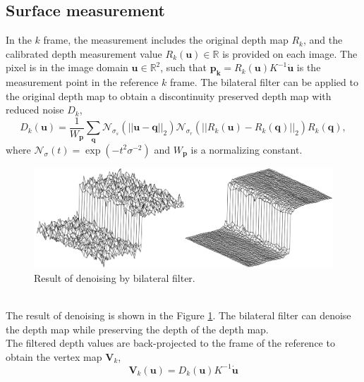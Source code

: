 \documentclass[a4paper,12pt]{article}
\begin{document}
\subsection{Surface measurement}
In the $k$ frame, the measurement includes the original depth map $R_k$, and the calibrated depth measurement value $R_k(\mathbf{u})\in\mathbb{R}$ is provided on each image. 
The pixel is in the image domain $\mathbf{u}\in\mathbb{R}^2$, such that $\mathbf{p_k} = R_k(\mathbf{u})K^{-1}\dot{\mathbf{u}}$ is the measurement point in the reference $k$ frame.
The bilateral filter can be applied to the original depth map to obtain a discontinuity preserved depth map with reduced noise $D_k$,
\begin{equation}
	D_{k}(\mathbf{u}) = \frac{1}{W_\mathbf{p}}\sum_{\mathbf{q}}\mathcal{N}_{\sigma_{s}}(||\mathbf{u}-\mathbf{q}||_2)\mathcal{N}_{\sigma_{r}}(||R_k(\mathbf{u})-R_k(\mathbf{q})||_2)R_k(\mathbf{q}),
	\label{equ2}
\end{equation}
where $\mathcal{N}_{\sigma}(t) = \exp(-t^{2}\sigma^{-2})$ and $W_{\mathbf{p}}$ is a normalizing constant.
\begin{figure}[h] %
    \centering %
    \includegraphics[scale=0.4]{figure2.png} %
    \caption{Result of denoising by bilateral filter\cite{710815}.} %
    \label{figure2} %
\end{figure}%
\\The result of denoising is shown in the Figure \ref{figure2}. The bilateral filter can denoise the depth map while preserving the depth of the depth map.
\\The filtered depth values are back-projected to the frame of the reference to obtain the vertex map $\mathbf{V}_k$,
\begin{equation}
	\mathbf{V}_k(\mathbf{u}) = D_k(\mathbf{u})K^{-1}\dot{\mathbf{u}}
	\label{equ3}
\end{equation}
\end{document}
